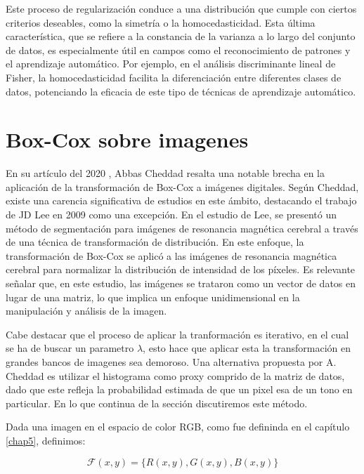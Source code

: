     Este proceso de regularizaci\'on conduce a una distribuci\'on que cumple con ciertos criterios deseables, como la simetr\'ia o la homocedasticidad. Esta \'ultima caracter\'istica, que se refiere a la constancia de la varianza a lo largo del conjunto de datos, es especialmente \'util en campos como el reconocimiento de patrones y el aprendizaje autom\'atico. Por ejemplo, en el an\'alisis discriminante lineal de Fisher, la homocedasticidad facilita la diferenciaci\'on entre diferentes clases de datos, potenciando la eficacia de este tipo de t\'ecnicas de aprendizaje autom\'atico.


    \section[]{Box-Cox sobre imagenes} 

    En su art\'iculo del 2020 \cite{boxcoximg}, Abbas Cheddad resalta una notable brecha en la aplicaci\'on de la transformaci\'on de Box-Cox a im\'agenes digitales. Seg\'un Cheddad, existe una carencia significativa de estudios en este \'ambito, destacando el trabajo de JD Lee en 2009 como una excepci\'on\cite{lee2009mr}. En el estudio de Lee, se present\'o un m\'etodo de segmentaci\'on para im\'agenes de resonancia magn\'etica cerebral a trav\'es de una t\'ecnica de transformaci\'on de distribuci\'on. En este enfoque, la transformaci\'on de Box-Cox se aplic\'o a las im\'agenes de resonancia magn\'etica cerebral para normalizar la distribuci\'on de intensidad de los p\'ixeles. Es relevante se\~nalar que, en este estudio, las im\'agenes se trataron como un vector de datos en lugar de una matriz, lo que implica un enfoque unidimensional en la manipulaci\'on y an\'alisis de la imagen.

    Cabe destacar que el proceso de aplicar la tranformaci\'on es iterativo, en el cual se ha de buscar un parametro $\lambda$, esto hace que aplicar esta la transformaci\'on en grandes bancos de imagenes sea demoroso. Una alternativa propuesta por A. Cheddad \cite{boxcoximg} es utilizar el histograma como proxy comprido de la matriz de datos, dado que este refleja la probabilidad estimada de que un pixel esa de un tono en particular. En lo que continua de la secci\'on discutiremos este m\'etodo.

    Dada una imagen en el espacio de color RGB, como fue defininda en el cap\'itulo \ref{chap5}, definimos:
    
    $$
    \mathcal{F}(x, y)=\{R(x, y), G(x, y), B(x, y)\}
    $$

